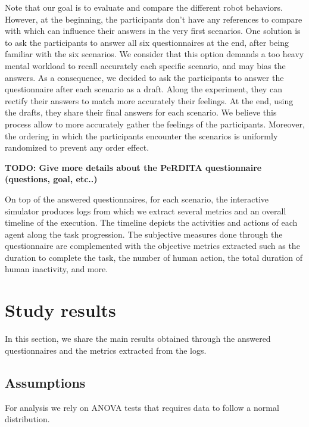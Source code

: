 Note that our goal is to evaluate and compare the different robot behaviors. However, at the beginning, the participants don't have any references to compare with which can influence their answers in the very first scenarios. One solution is to ask the participants to answer all six questionnaires at the end, after being familiar with the six scenarios. We consider that this option demands a too heavy mental workload to recall accurately each specific scenario, and may bias the answers. As a consequence, we decided to ask the participants to answer the questionnaire after each scenario as a draft. Along the experiment, they can rectify their answers to match more accurately their feelings. At the end, using the drafts, they share their final answers for each scenario. We believe this process allow to more accurately gather the feelings of the participants. Moreover, the ordering in which the participants encounter the scenarios is uniformly randomized to prevent any order effect. 

\textbf{TODO: Give more details about the PeRDITA questionnaire (questions, goal, etc..)}

On top of the answered questionnaires, for each scenario, the interactive simulator produces logs from which we extract several metrics and an overall timeline of the execution. The timeline depicts the activities and actions of each agent along the task progression. The subjective measures done through the questionnaire are complemented with the objective metrics extracted such as the duration to complete the task, the number of human action, the total duration of human inactivity, and more. 





\section{Study results}


In this section, we share the main results obtained through the answered questionnaires and the metrics extracted from the logs.

\subsection{Assumptions}

For analysis we rely on ANOVA tests that requires data to follow a normal distribution. 

